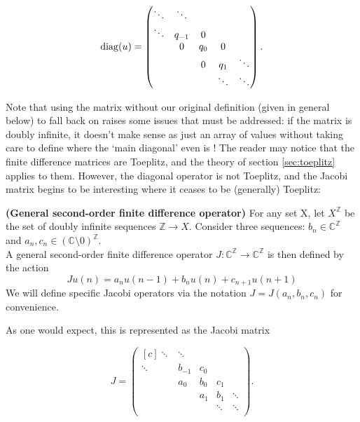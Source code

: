 \documentclass[../main.tex]{subfiles}
\begin{document}
$$
\diag(u) =
\begin{pmatrix*}[c]
\ddots & \ddots & & & \\
\ddots & q_{-1} & 0 & & \\
& 0 & q_0 & 0 & \\
& & 0 & q_1 & \ddots \\
& & & \ddots & \ddots \\
\end{pmatrix*}.
$$

Note that using the matrix without our original definition (given in general below) to fall back on raises some issues that must be addressed: if the matrix is doubly infinite, it doesn't make sense as just an array of values without taking care to define where the `main diagonal' even is \cite{lindner2013where}!
The reader may notice that the finite difference matrices are Toeplitz, and the theory of section \ref{sec:toeplitz} applies to them. However, the diagonal operator is not Toeplitz, and the Jacobi matrix begins to be interesting where it ceases to be (generally) Toeplitz:

\begin{definition}{\textbf{(General second-order finite difference operator)}}
For any set X, let $X^\mathbb{Z}$ be the set of doubly infinite sequences $\mathbb{Z} \rightarrow X$. Consider three sequences: $b_n \in \mathbb{C}^\mathbb{Z}$ and $a_n, c_n \in (\mathbb{C} \setminus 0)^\mathbb{Z}$.\\
A general second-order finite difference operator $J: \mathbb{C}^\mathbb{Z} \rightarrow \mathbb{C}^\mathbb{Z}$ is then defined by the action
\begin{equation}\label{eqn:2efde}
Ju (n) = a_n u(n-1) + b_n u(n) + c_{n+1} u(n+1)
\end{equation}
We will define specific Jacobi operators via the notation $J = J(a_n, b_n, c_n)$ for convenience.
\end{definition}
As one would expect, this is represented as the Jacobi matrix

$$
J =
\begin{pmatrix*}[c]
\ddots & \ddots & & & \\
\ddots & b_{-1} & c_0 & & \\
& a_0 & b_0 & c_1 & \\
& & a_1 & b_1 & \ddots \\
& & & \ddots & \ddots \\
\end{pmatrix*}.
$$
\end{document}

